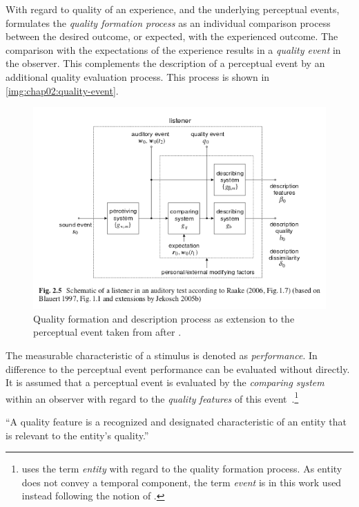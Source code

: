 With regard to quality of an experience, and the underlying perceptual events, \citet{jekosch_voice_2005} formulates the \emph{quality formation process} as an individual comparison process between the desired outcome, or expected, with the experienced outcome.
The comparison with the expectations of the experience results in a \emph{quality event} in the observer.
This complements the description of a perceptual event by an additional quality evaluation process.
This process is shown in \autoref{img:chap02:quality-event}.
\begin{figure}
	\includegraphics[width=1\textwidth]{figure/quality-event}
	\caption{Quality formation and description process as extension to the perceptual event taken from \cite{waltermann_dimension-based_2013} after \cite{raake_short-_2006}.}
	\label{img:chap02:quality-event} %
\end{figure}

The measurable characteristic of a stimulus is denoted as \emph{performance}.
In difference to the perceptual event performance can be evaluated without directly. 
It is assumed that a perceptual event is evaluated by the \emph{comparing system} within an observer with regard to the \emph{quality features} of this event~\citet[\cf p. 17]{jekosch_voice_2005}.\footnote{\citet{jekosch_voice_2005} uses the term \emph{entity} with regard to the quality formation process.
As entity does not convey a temporal component, the term \emph{event} is in this work used instead following the notion of \cite{blauert_spatial_1996}.}

\begin{definition}
``A quality feature is a recognized and designated characteristic of an entity that is relevant to the entity's quality.''~\citep[p. 17]{jekosch_voice_2005}
\end{definition}

